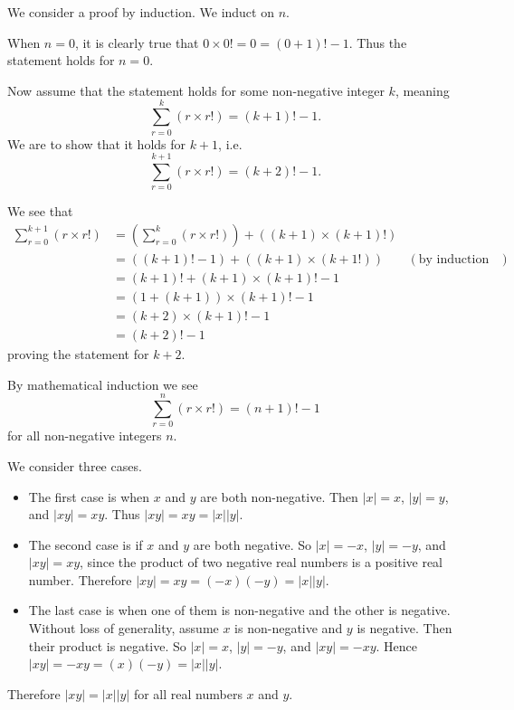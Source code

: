 \begin{questions}
    \item We consider a proof by induction. We induct on $n$.

    When $n = 0$, it is clearly true that $0 \times 0! = 0 = (0+1)! - 1$. Thus the statement holds for $n = 0$.

    Now assume that the statement holds for some non-negative integer $k$, meaning
    \[
        \sum_{r=0}^k (r\times r!) = (k+1)! - 1.
    \]
    We are to show that it holds for $k+1$, i.e.
    \[
        \sum_{r=0}^{k+1} (r\times r!) = (k+2)! - 1.
    \]

    We see that
    \begin{align*}
        \sum_{r=0}^{k+1} (r\times r!) &= \left(\sum_{r=0}^k (r\times r!)\right) + ((k+1) \times (k+1)!)\\
        &= ((k+1)! - 1) + ((k+1) \times (k+1!)) & (\text{by induction hypothesis})\\
        &= (k+1)! + (k+1) \times (k+1)! - 1\\
        &= (1 + (k+1))\times(k+1)! - 1\\
        &= (k+2) \times (k+1)! - 1\\
        &= (k+2)! - 1
    \end{align*}
    proving the statement for $k + 2$.

    By mathematical induction we see
    \[
        \sum_{r=0}^n (r\times r!) = (n+1)! - 1
    \]
    for all non-negative integers $n$.

    \item \begin{partquestions}{\roman*}
        \item We consider three cases.
        \begin{itemize}
            \item The first case is when $x$ and $y$ are both non-negative. Then $|x| = x$, $|y| = y$, and $|xy| = xy$. Thus $|xy| = xy = |x||y|$.
            \item The second case is if $x$ and $y$ are both negative. So $|x| = -x$, $|y| = -y$, and $|xy| = xy$, since the product of two negative real numbers is a positive real number. Therefore $|xy| = xy = (-x)(-y) = |x||y|$.
            \item The last case is when one of them is non-negative and the other is negative. Without loss of generality, assume $x$ is non-negative and $y$ is negative. Then their product is negative. So $|x| = x$, $|y| = -y$, and $|xy| = -xy$. Hence $|xy| = -xy = (x)(-y) = |x||y|$.
        \end{itemize}
        Therefore $|xy| = |x||y|$ for all real numbers $x$ and $y$.


\end{partquestions}
\end{questions}
